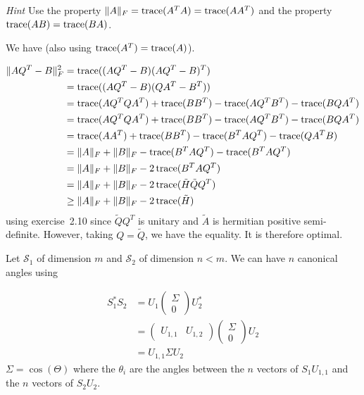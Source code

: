 \begin{solution}
  \emph{Hint} Use the property $\|A\|_F = \operatorname{trace}(A^TA) = \operatorname{trace}(AA^T)$ and the property $\operatorname{trace}(AB) = \operatorname{trace}(BA)$.

  We have (also using $\operatorname{trace}(A^T) = \operatorname{trace}(A)$).

  \begin{align*}
    \|AQ^T - B\|_F^2
    & = \operatorname{trace}((AQ^T - B)(AQ^T - B)^T)\\
    & = \operatorname{trace}((AQ^T - B)(QA^T - B^T))\\
    & = \operatorname{trace}(AQ^TQA^T) + \operatorname{trace}(BB^T) - \operatorname{trace}(AQ^TB^T) - \operatorname{trace}(BQA^T)\\
    & = \operatorname{trace}(AQ^TQA^T) + \operatorname{trace}(BB^T) - \operatorname{trace}(AQ^TB^T) - \operatorname{trace}(BQA^T)\\
    & = \operatorname{trace}(AA^T) + \operatorname{trace}(BB^T) - \operatorname{trace}(B^TAQ^T) - \operatorname{trace}(QA^TB)\\
    & = \|A\|_F + \|B\|_F - \operatorname{trace}(B^TAQ^T) - \operatorname{trace}(B^TAQ^T)\\
    & = \|A\|_F + \|B\|_F - 2\operatorname{trace}(B^TAQ^T)\\
    & = \|A\|_F + \|B\|_F - 2\operatorname{trace}(\tilde{H}\tilde{Q} Q^T)\\
    & \geq \|A\|_F + \|B\|_F - 2\operatorname{trace}(\tilde{H})
  \end{align*}
  using exercise~2.10 since $\tilde{Q}Q^T$ is unitary and $\tilde{A}$ is hermitian positive semi-definite.
  However, taking $Q = \tilde{Q}$, we have the equality. It is therefore optimal.
\end{solution}

\begin{solution}
  Let $\mathcal{S}_1$ of dimension $m$ and $\mathcal{S}_2$ of dimension $n < m$.
  We can have $n$ canonical angles using

  \begin{align*}
    S_1^*S_2
    & = U_1
    \begin{pmatrix}
      \Sigma\\0
    \end{pmatrix}
    U_2^*\\
    & =
    \begin{pmatrix}
      U_{1,1} & U_{1,2}
    \end{pmatrix}
    \begin{pmatrix}
      \Sigma\\0
    \end{pmatrix}
    U_2\\
    & = U_{1,1} \Sigma U_2
  \end{align*}
  $\Sigma = \cos(\Theta)$ where the $\theta_i$ are the angles between the $n$ vectors of $S_1U_{1,1}$
  and the $n$ vectors of $S_2U_2$.
\end{solution}

